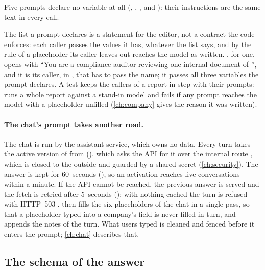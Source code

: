 Five prompts declare no variable at all (, ,
,  and ): their
instructions are the same text in every call.

The list a prompt declares is a statement for the editor, not a contract the code enforces:
each caller passes the values it has, whatever the list says, and by the rule of 
a placeholder its caller leaves out reaches the model as written. ,
for one, opens with \enquote{You are a compliance auditor
reviewing one internal document of }, and it is its caller,
 in , that has to pass the name; it passes
all three variables the prompt declares. A test keeps the callers of a report in step with
their prompts:  runs a whole report against a stand-in
model and fails if any prompt reaches the model with a placeholder unfilled
(\cref{ch:company} gives the reason it was written).

\paragraph{The chat's prompt takes another road.} The chat is run by the assistant service,
which owns no data. Every turn takes the active version of  from
 (), which asks the API for it over the internal route
, which is closed to the outside and guarded by a
shared secret (\cref{ch:security}). The answer is kept for 60~seconds (), so an
activation reaches live conversations within a minute. If the API cannot be reached, the
previous answer is served and the fetch is retried after 5~seconds (); with
nothing cached the turn is refused with HTTP~503 .
 then fills the six placeholders of the chat in a single pass, so that
a placeholder typed into a company's field is never filled in turn, and appends the notes of
the turn. What users typed is cleaned and fenced before it enters the prompt; \cref{ch:chat}
describes that.

\subsection{The schema of the answer}\label{sec:prompts:schemas}

